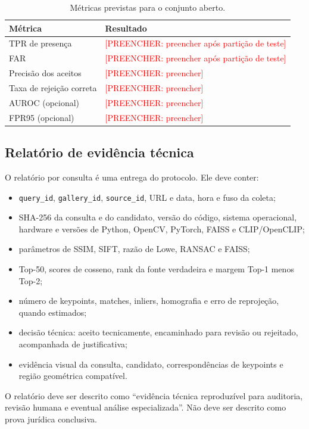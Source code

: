 \documentclass[12pt]{article}
\newcommand{\todo}[1]{\textcolor{red}{[PREENCHER: #1]}}
\newcommand{\sift}{SIFT}
\newcommand{\ssim}{SSIM}
\newcommand{\faiss}{FAISS}
\begin{document}
\begin{table}[H]
\centering
\caption{Métricas previstas para o conjunto aberto.}
\label{tab:aberto}
\begin{tabularx}{\linewidth}{Y Y}
\toprule
\textbf{Métrica} & \textbf{Resultado}\\
\midrule
TPR de presença & \todo{preencher após partição de teste}\\
FAR & \todo{preencher após partição de teste}\\
Precisão dos aceitos & \todo{preencher}\\
Taxa de rejeição correta & \todo{preencher}\\
AUROC (opcional) & \todo{preencher}\\
FPR95 (opcional) & \todo{preencher}\\
\bottomrule
\end{tabularx}
\end{table}

\subsection{Relatório de evidência técnica}

O relatório por consulta é uma entrega do protocolo. Ele deve conter:

\begin{itemize}[leftmargin=*]
  \item \texttt{query\_id}, \texttt{gallery\_id}, \texttt{source\_id}, URL e
  data, hora e fuso da coleta;
  \item SHA-256 da consulta e do candidato, versão do código, sistema
  operacional, hardware e versões de Python, OpenCV, PyTorch, \faiss{} e
  CLIP/OpenCLIP;
  \item parâmetros de \ssim{}, \sift{}, razão de Lowe, RANSAC e \faiss{};
  \item Top-50, scores de cosseno, rank da fonte verdadeira e margem
  Top-1 menos Top-2;
  \item número de keypoints, matches, inliers, homografia e erro de
  reprojeção, quando estimados;
  \item decisão técnica: aceito tecnicamente, encaminhado para revisão ou
  rejeitado, acompanhada de justificativa;
  \item evidência visual da consulta, candidato, correspondências de
  keypoints e região geométrica compatível.
\end{itemize}

O relatório deve ser descrito como ``evidência técnica reproduzível para
auditoria, revisão humana e eventual análise especializada''. Não deve ser
descrito como prova jurídica conclusiva.
\end{document}
